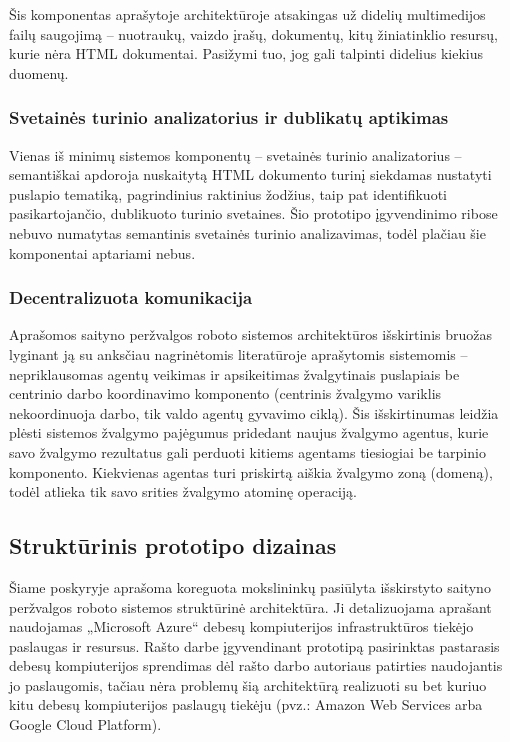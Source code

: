 Šis komponentas aprašytoje architektūroje atsakingas už didelių multimedijos failų saugojimą -- nuotraukų, vaizdo įrašų, dokumentų, kitų žiniatinklio resursų, kurie nėra HTML dokumentai. Pasižymi tuo, jog gali talpinti didelius kiekius duomenų.

\subsubsection{Svetainės turinio analizatorius ir dublikatų aptikimas}

Vienas iš minimų sistemos komponentų -- svetainės turinio analizatorius -- semantiškai apdoroja nuskaitytą HTML dokumento turinį siekdamas nustatyti puslapio tematiką, pagrindinius raktinius žodžius, taip pat identifikuoti pasikartojančio, dublikuoto turinio svetaines. Šio prototipo įgyvendinimo ribose nebuvo numatytas semantinis svetainės turinio analizavimas, todėl plačiau šie komponentai aptariami nebus.

\subsubsection{Decentralizuota komunikacija}

Aprašomos saityno peržvalgos roboto sistemos architektūros išskirtinis bruožas lyginant ją su anksčiau nagrinėtomis literatūroje aprašytomis sistemomis -- nepriklausomas agentų veikimas ir apsikeitimas žvalgytinais puslapiais be centrinio darbo koordinavimo komponento \cite{MercedCloudBasedWebCrawler} (centrinis žvalgymo variklis nekoordinuoja darbo, tik valdo agentų gyvavimo ciklą). Šis išskirtinumas leidžia plėsti sistemos žvalgymo pajėgumus pridedant naujus žvalgymo agentus, kurie savo žvalgymo rezultatus gali perduoti kitiems agentams tiesiogiai be tarpinio komponento. Kiekvienas agentas turi priskirtą aiškia žvalgymo zoną (domeną), todėl atlieka tik savo srities žvalgymo atominę operaciją.

\subsection{Struktūrinis prototipo dizainas}

Šiame poskyryje aprašoma koreguota \cite{MercedCloudBasedWebCrawler} mokslininkų pasiūlyta išskirstyto saityno peržvalgos roboto sistemos struktūrinė architektūra. Ji detalizuojama aprašant naudojamas „Microsoft Azure“ debesų kompiuterijos infrastruktūros tiekėjo paslaugas ir resursus. Rašto darbe įgyvendinant prototipą pasirinktas pastarasis debesų kompiuterijos sprendimas dėl rašto darbo autoriaus patirties naudojantis jo paslaugomis, tačiau nėra problemų šią architektūrą realizuoti su bet kuriuo kitu debesų kompiuterijos paslaugų tiekėju (pvz.: Amazon Web Services arba Google Cloud Platform).

